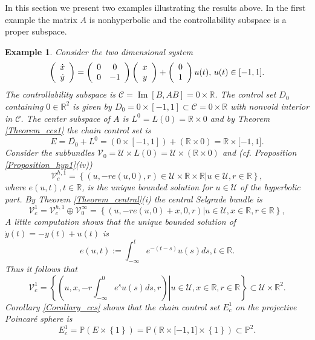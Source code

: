 \documentclass{siamltex}%
\newtheorem{example}[theorem]{Example}
\begin{document}
In this section we present two examples illustrating the results above. In the
first example the matrix $A$ is nonhyperbolic and the controllability subspace
is a proper subspace.

\begin{example}
Consider the two dimensional system%
\[
\left(
\begin{array}
[c]{c}%
\dot{x}\\
\dot{y}%
\end{array}
\right)  =\left(
\begin{array}
[c]{cc}%
0 & 0\\
0 & -1
\end{array}
\right)  \left(
\begin{array}
[c]{c}%
x\\
y
\end{array}
\right)  +\left(
\begin{array}
[c]{c}%
0\\
1
\end{array}
\right)  u(t),\,u(t)\in\lbrack-1,1].
\]
The controllability subspace is $\mathcal{C}=\operatorname{Im}[B,AB]=0\times
\mathbb{R}$. The control set $D_{0}$ containing $0\in\mathbb{R}^{2}$ is given
by $D_{0}=0\times\left[  -1,1\right]  \subset\mathcal{C}=0\times\mathbb{R}$
with nonvoid interior in $\mathcal{C}$. The center subspace of $A$ is
$L^{0}=L(0)=\mathbb{R}\times0$ and by Theorem \ref{Theorem_ccs1} the chain
control set is%
\[
E=\overline{D_{0}}+L^{0}=\left(  0\times\left[  -1,1\right]  \right)  +\left(
\mathbb{R}\times0\right)  =\mathbb{R}\times\lbrack-1,1].
\]
Consider the subbundles $\mathcal{V}_{0}=\mathcal{U}\times L(0)=\mathcal{U}%
\times\left(  \mathbb{R}\times0\right)  $ and (cf. Proposition
\ref{Proposition_hyp1}(iv))%
\[
\mathcal{V}_{c}^{h,1}=\left\{  (u,-re(u,0),r)\in\mathcal{U}\times
\mathbb{R}\times\mathbb{R}\left\vert u\in\mathcal{U},r\in\mathbb{R}\right.
\right\}  ,
\]
where $e(u,t),t\in\mathbb{R}$, is the unique bounded solution for
$u\in\mathcal{U}$ of the hyperbolic part. By Theorem \ref{Theorem_central}(i)
the central Selgrade bundle is%
\[
\mathcal{V}_{c}^{1}=\mathcal{V}_{c}^{h,1}\oplus\mathcal{V}_{0}^{\infty
}=\left\{  (u,-re(u,0)+x,0,r)\left\vert u\in\mathcal{U},x\in\mathbb{R}%
,r\in\mathbb{R}\right.  \right\}  ,
\]
A little computation shows that the unique bounded solution of $\dot
{y}(t)=-y(t)+u(t)$ is%
\begin{equation}
e(u,t):=\int_{-\infty}^{t}e^{-(t-s)}u(s)ds,t\in\mathbb{R}. \label{bounded}%
\end{equation}
Thus it follows that%
\[
\mathcal{V}_{c}^{1}=\left\{  \left.  \left(  u,x,-r\int_{-\infty}^{0}%
e^{s}u(s)ds,r\right)  \right\vert u\in\mathcal{U},x\in\mathbb{R}%
,r\in\mathbb{R}\right\}  \subset\mathcal{U}\times\mathbb{R}^{2}.
\]
Corollary \ref{Corollary_ccs} shows that the chain control set $E_{c}^{1}$ on
the projective Poincar\'{e} sphere is%
\[
E_{c}^{1}=\mathbb{P}\left(  E\times\left\{  1\right\}  \right)  =\mathbb{P}%
\left(  \mathbb{R}\times\lbrack-1,1]\times\left\{  1\right\}  \right)
\subset\mathbb{P}^{2}.
\]

\end{example}
\end{document}
